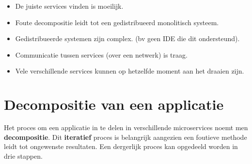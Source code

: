 \begin{itemize}
\begin{itemize}
\begin{itemize}
			\end{itemize}
			\item[\alert] De juiste services vinden is moeilijk.
			\item[\alert] Foute decompositie leidt tot een gedistribueerd monolitisch systeem.
			\item[\alert] Gedistribueerde systemen zijn complex. (bv geen IDE die dit ondersteund).
			\item[\alert] Communicatie tussen services (over een netwerk) is traag.
			\item[\alert] Vele verschillende services kunnen op hetzelfde moment aan het draaien zijn. 
		\end{itemize}
	\end{itemize}
	
	\chapter{Decompositie van een applicatie}
	Het proces om een applicatie in te delen in verschillende microservices noemt men \textbf{decompositie}. Dit \textbf{iteratief} proces is belangrijk aangezien een foutieve methode leidt tot ongewenste resultaten. Een dergerlijk proces kan opgedeeld worden in drie stappen.
